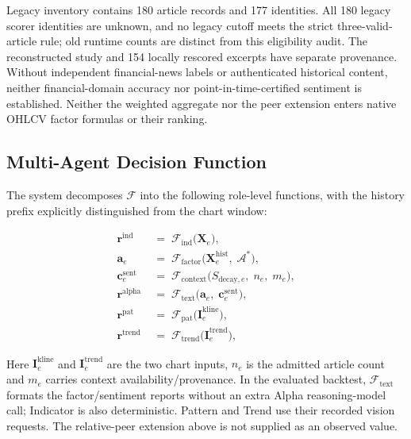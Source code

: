 Legacy inventory contains 180 article records and 177 identities. All 180 legacy scorer identities are unknown, and no legacy cutoff meets the strict three-valid-article rule; old runtime counts are distinct from this eligibility audit. The reconstructed study and 154 locally rescored excerpts have separate provenance. Without independent financial-news labels or authenticated historical content, neither financial-domain accuracy nor point-in-time-certified sentiment is established. Neither the weighted aggregate nor the peer extension enters native OHLCV factor formulas or their ranking.

\subsection{Multi-Agent Decision Function}
The system decomposes $\mathcal{F}$ into the following role-level functions, with the history prefix explicitly distinguished from the chart window:

\begin{align}
    \mathbf{r}^{\mathrm{ind}}
    &\;=\; \mathcal{F}_{\mathrm{ind}}\!\bigl(\mathbf{X}_e\bigr),
    \label{eq:ind} \\
    \mathbf{a}_e
    &\;=\; \mathcal{F}_{\mathrm{factor}}\!\bigl(
            \mathbf{X}^{\mathrm{hist}}_e,\; \mathcal{A}^{*}
           \bigr),
    \label{eq:alpha_factor} \\
    \mathbf{c}^{\mathrm{sent}}_e
    &\;=\; \mathcal{F}_{\mathrm{context}}\!\bigl(
            S_{\mathrm{decay},e},\; n_e,\; m_e
           \bigr),
    \label{eq:sent_context} \\
    \mathbf{r}^{\mathrm{alpha}}
    &\;=\; \mathcal{F}_{\mathrm{text}}\!\bigl(
            \mathbf{a}_e,\; \mathbf{c}^{\mathrm{sent}}_e
           \bigr),
    \label{eq:alpha} \\
    \mathbf{r}^{\mathrm{pat}}
    &\;=\; \mathcal{F}_{\mathrm{pat}}\!\bigl(
            \mathbf{I}^{\mathrm{kline}}_e
           \bigr),
    \label{eq:pat} \\
    \mathbf{r}^{\mathrm{trend}}
    &\;=\; \mathcal{F}_{\mathrm{trend}}\!\bigl(
            \mathbf{I}^{\mathrm{trend}}_e
           \bigr),
    \label{eq:trend}
\end{align}


Here $\mathbf{I}^{\mathrm{kline}}_e$ and $\mathbf{I}^{\mathrm{trend}}_e$ are the two chart inputs, $n_e$ is the admitted article count and $m_e$ carries context availability/provenance. In the evaluated backtest, $\mathcal{F}_{\mathrm{text}}$ formats the factor/sentiment reports without an extra Alpha reasoning-model call; Indicator is also deterministic. Pattern and Trend use their recorded vision requests. The relative-peer extension above is not supplied as an observed value.

